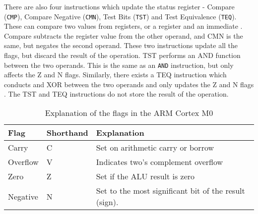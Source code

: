\documentclass[12pt,a4paper]{article}
\begin{document}
\begin{bibunit}[is-unsrt]
There are also four instructions which update the status register - Compare (\texttt{CMP}), Compare Negative (\texttt{CMN}), Test Bits (\texttt{TST}) and Test Equivalence (\texttt{TEQ}).
These can compare two values from registers, or a register and an immediate \cite{ARM:CMPCMN}.
Compare subtracts the register value from the other operand, and CMN is the same, but negates the second operand.
These two instructions update all the flags, but discard the result of the operation.
TST performs an AND function between the two operands. 
This is the same as an \texttt{AND} instruction, but only affects the Z and N flags.
Similarly, there exists a TEQ instruction which conducts and XOR between the two operands and only updates the Z and N flags \cite{ARM:TSTTEQ}.
The TST and TEQ instructions do not store the result of the operation.


%

\begin{table}
\centering
\caption{Explanation of the flags in the ARM Cortex M0}
\label{tab:m0:flags}
\begin{tabular}{p{}p{}p{}}\hline
Flag & Shorthand & Explanation \\ \hline
Carry & C & Set on arithmetic carry or borrow\\
Overflow & V & Indicates two's complement overflow\\
Zero & Z & Set if the ALU result is zero\\
Negative & N & Set to the most significant bit of the result (sign). \\
\end{tabular}
\end{table}

\end{bibunit}
\end{document}
